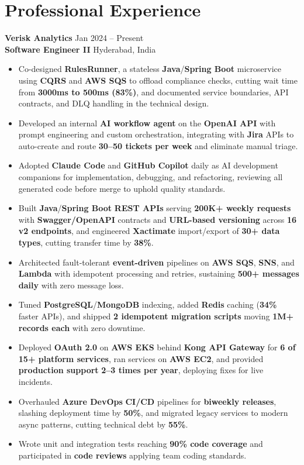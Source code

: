 \documentclass[a4paper,10pt]{article}
\begin{document}
\section*{Professional Experience}

\textbf{Verisk Analytics} \hfill Jan 2024 -- Present \\
\textbf{Software Engineer II} \hfill Hyderabad, India

\begin{itemize}[leftmargin=*]
    \item Co-designed \textbf{RulesRunner}, a stateless \textbf{Java}/\textbf{Spring Boot} microservice using \textbf{CQRS} and \textbf{AWS SQS} to offload compliance checks, cutting wait time from \textbf{3000ms to 500ms (83\%)}, and documented service boundaries, API contracts, and DLQ handling in the technical design.
    \item Developed an internal \textbf{AI workflow agent} on the \textbf{OpenAI API} with prompt engineering and custom orchestration, integrating with \textbf{Jira} APIs to auto-create and route \textbf{30--50 tickets per week} and eliminate manual triage.
    \item Adopted \textbf{Claude Code} and \textbf{GitHub Copilot} daily as AI development companions for implementation, debugging, and refactoring, reviewing all generated code before merge to uphold quality standards.
    \item Built \textbf{Java}/\textbf{Spring Boot} \textbf{REST APIs} serving \textbf{200K+ weekly requests} with \textbf{Swagger/OpenAPI} contracts and \textbf{URL-based versioning} across \textbf{16 v2 endpoints}, and engineered \textbf{Xactimate} import/export of \textbf{30+ data types}, cutting transfer time by \textbf{38\%}.
    \item Architected fault-tolerant \textbf{event-driven} pipelines on \textbf{AWS SQS}, \textbf{SNS}, and \textbf{Lambda} with idempotent processing and retries, sustaining \textbf{500+ messages daily} with zero message loss.
    \item Tuned \textbf{PostgreSQL}/\textbf{MongoDB} indexing, added \textbf{Redis} caching (\textbf{34\%} faster APIs), and shipped \textbf{2 idempotent migration scripts} moving \textbf{1M+ records each} with zero downtime.
    \item Deployed \textbf{OAuth 2.0} on \textbf{AWS EKS} behind \textbf{Kong API Gateway} for \textbf{6 of 15+ platform services}, ran services on \textbf{AWS EC2}, and provided \textbf{production support} \textbf{2--3 times per year}, deploying fixes for live incidents.
    \item Overhauled \textbf{Azure DevOps} \textbf{CI/CD} pipelines for \textbf{biweekly releases}, slashing deployment time by \textbf{50\%}, and migrated legacy services to modern async patterns, cutting technical debt by \textbf{55\%}.
    \item Wrote unit and integration tests reaching \textbf{90\% code coverage} and participated in \textbf{code reviews} applying team coding standards.
\end{itemize}
\end{document}
